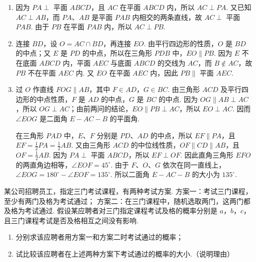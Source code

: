 \begin{solution}
\begin{enumerate}
\item 因为 \(PA\perp\) 平面 \(ABCD\)，且 \(AC\) 在平面 \(ABCD\) 内，所以 \(AC\perp PA\). 又已知 \(AC\perp AB\)，而 \(PA\)、\(AB\) 是平面 \(PAB\) 内相交的两条直线，故 \(AC\perp\) 平面 \(PAB\). 由于 \(PB\) 在平面 \(PAB\) 内，所以 \(AC\perp PB\).
\item 连接 \(BD\)，设 \(O=AC\cap BD\)，再连接 \(EO\). 由平行四边形的性质，\(O\) 是 \(BD\) 的中点；又 \(E\) 是 \(PD\) 的中点，所以在三角形 \(PDB\) 中，\(EO\parallel PB\). 因为 \(E\) 不在底面 \(ABCD\) 内，平面 \(AEC\) 与底面 \(ABCD\) 的交线为 \(AC\)，而 \(B\notin AC\)，故 \(PB\) 不在平面 \(AEC\) 内. 又 \(EO\) 在平面 \(AEC\) 内，因此 \(PB\parallel\) 平面 \(AEC\).
\item 过 \(O\) 作直线 \(FOG\parallel AB\)，其中 \(F\in AD\)，\(G\in BC\). 由三角形 \(ACD\) 及平行四边形的中点性质，\(F\) 是 \(AD\) 的中点，\(G\) 是 \(BC\) 的中点. 因为 \(OG\parallel AB\perp AC\)，所以 \(OG\perp AC\)；由前两问的结论，\(EO\parallel PB\perp AC\)，所以 \(EO\perp AC\). 因而 \(\angle EOG\) 是二面角 \(E-AC-B\) 的平面角.

在三角形 \(PAD\) 中，\(E\)、\(F\) 分别是 \(PD\)、\(AD\) 的中点，所以 \(EF\parallel PA\)，且 \(EF=\frac12PA=\frac12AB\). 又由三角形 \(ACD\) 的中位线性质，\(OF\parallel CD\parallel AB\)，且 \(OF=\frac12AB\). 因为 \(PA\perp\) 平面 \(ABCD\)，所以 \(EF\perp OF\). 因此直角三角形 \(EFO\) 的两直角边相等，\(\angle EOF=45^\circ\). 由于 \(F\)、\(O\)、\(G\) 依次在同一直线上，\(\angle EOG=180^\circ-\angle EOF=135^\circ\). 所以二面角 \(E-AC-B\) 的大小为 \(135^\circ\).
\end{enumerate}
\end{solution}

\begin{problem}
某公司招聘员工，指定三门考试课程，有两种考试方案.
方案一：考试三门课程，至少有两门及格为考试通过；
方案二：在三门课程中，随机选取两门，这两门都及格为考试通过.
假设某应聘者对三门指定课程考试及格的概率分别是 \(a\)，\(b\)，\(c\)，且三门课程考试是否及格相互之间没有影响.

\begin{enumerate}
\item 分别求该应聘者用方案一和方案二时考试通过的概率；
\item 试比较该应聘者在上述两种方案下考试通过的概率的大小.（说明理由）
\end{enumerate}
\end{problem}


